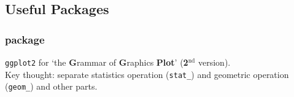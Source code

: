     
    
    




    










\subsection{Useful Packages}

\subsubsection{ package}
    \lstinline|ggplot2| for `the \textbf{G}rammar of \textbf{G}raphics \textbf{Plot}' (\textbf{2}$^\mathrm{nd}$ version). \\
    Key thought: separate statistics operation (\lstinline|stat_|) and geometric operation (\lstinline|geom_|) and other parts.

